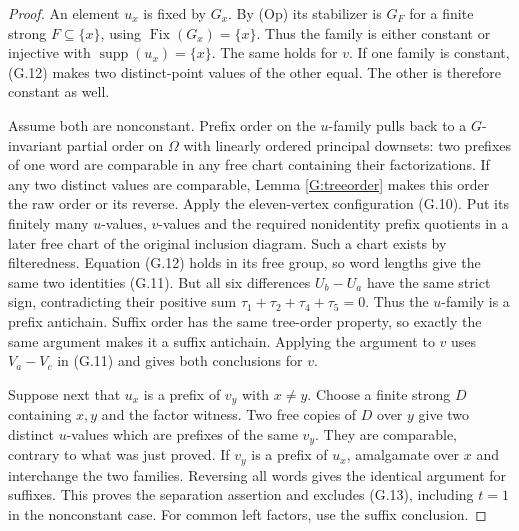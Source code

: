 \begin{proof}
An element $u_x$ is fixed by $G_x$.  By (Op) its stabilizer
is $G_F$ for a finite strong $F\subseteq\{x\}$, using
$\operatorname{Fix}(G_x)=\{x\}$.  Thus the family is either
constant or injective with $\operatorname{supp}(u_x)=\{x\}$.
The same holds for $v$.  If one family is constant, (G.12)
makes two distinct-point values of the other equal.  The
other is therefore constant as well.

Assume both are nonconstant.  Prefix order on the $u$-family
pulls back to a $G$-invariant partial order on $\Omega$ with
linearly ordered principal downsets: two prefixes of one word
are comparable in any free chart containing their factorizations.
If any two distinct values are comparable, Lemma
\ref{G:treeorder} makes this order the raw order or its reverse.
Apply the eleven-vertex configuration (G.10).  Put its finitely
many $u$-values, $v$-values and the required nonidentity prefix
quotients in a later free chart of the original inclusion
diagram.  Such a chart exists by filteredness.  Equation
(G.12) holds in its free group, so word lengths give the same
two identities (G.11).  But all six differences
$U_b-U_a$ have the same strict sign, contradicting their
positive sum $\tau_1+\tau_2+\tau_4+\tau_5=0$.
Thus the $u$-family is a prefix antichain.  Suffix order has
the same tree-order property, so exactly the same argument
makes it a suffix antichain.  Applying the argument to $v$
uses $V_a-V_c$ in (G.11) and gives both conclusions for $v$.

Suppose next that $u_x$ is a prefix of $v_y$ with $x\ne y$.
Choose a finite strong $D$ containing $x,y$ and the factor
witness.  Two free copies of $D$ over $y$ give two distinct
$u$-values which are prefixes of the same $v_y$.  They are
comparable, contrary to what was just proved.  If $v_y$ is a
prefix of $u_x$, amalgamate over $x$ and interchange the two
families.  Reversing all words gives the identical argument
for suffixes.  This proves the separation assertion and
excludes (G.13), including $t=1$ in the nonconstant case.
For common left factors, use the suffix conclusion.
\end{proof}

